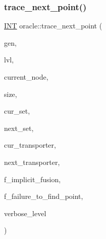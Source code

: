 \subsubsection{\texorpdfstring{trace\+\_\+next\+\_\+point()}{trace\_next\_point()}}
{\footnotesize\ttfamily \mbox{\hyperlink{galois_8h_a09fddde158a3a20bd2dcadb609de11dc}{I\+NT}} oracle\+::trace\+\_\+next\+\_\+point (\begin{DoxyParamCaption}\item[{\mbox{\hyperlink{classgenerator}{generator}} $\ast$}]{gen,  }\item[{\mbox{\hyperlink{galois_8h_a09fddde158a3a20bd2dcadb609de11dc}{I\+NT}}}]{lvl,  }\item[{\mbox{\hyperlink{galois_8h_a09fddde158a3a20bd2dcadb609de11dc}{I\+NT}}}]{current\+\_\+node,  }\item[{\mbox{\hyperlink{galois_8h_a09fddde158a3a20bd2dcadb609de11dc}{I\+NT}}}]{size,  }\item[{\mbox{\hyperlink{galois_8h_a09fddde158a3a20bd2dcadb609de11dc}{I\+NT}} $\ast$}]{cur\+\_\+set,  }\item[{\mbox{\hyperlink{galois_8h_a09fddde158a3a20bd2dcadb609de11dc}{I\+NT}} $\ast$}]{next\+\_\+set,  }\item[{\mbox{\hyperlink{galois_8h_a09fddde158a3a20bd2dcadb609de11dc}{I\+NT}} $\ast$}]{cur\+\_\+transporter,  }\item[{\mbox{\hyperlink{galois_8h_a09fddde158a3a20bd2dcadb609de11dc}{I\+NT}} $\ast$}]{next\+\_\+transporter,  }\item[{\mbox{\hyperlink{galois_8h_a09fddde158a3a20bd2dcadb609de11dc}{I\+NT}}}]{f\+\_\+implicit\+\_\+fusion,  }\item[{\mbox{\hyperlink{galois_8h_a09fddde158a3a20bd2dcadb609de11dc}{I\+NT}} \&}]{f\+\_\+failure\+\_\+to\+\_\+find\+\_\+point,  }\item[{\mbox{\hyperlink{galois_8h_a09fddde158a3a20bd2dcadb609de11dc}{I\+NT}}}]{verbose\+\_\+level }\end{DoxyParamCaption})}

\mbox{\label{classoracle_a4dbea33418d5c0f550a960a5c83194a5}} 
